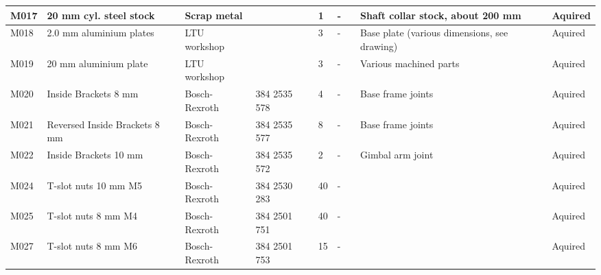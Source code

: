 \begin{longtable}{|m{}|m{}|m{}|m{}|m{}|m{}|m{}|m{}|m{}|}
M017        & 20 mm cyl. steel stock              & Scrap metal       &                         & 1            & -                            &                            & Shaft collar stock, about 200 mm                         & Aquired         \\ \hline
M018        & 2.0 mm aluminium plates             & LTU workshop      &                         & 3            & -                            &                            & Base plate (various dimensions, see drawing)             & Aquired         \\ \hline
M019        & 20 mm aluminium plate               & LTU workshop      &                         & 3            & -                            &                            & Various machined parts                                   & Aquired         \\ \hline
M020        & Inside Brackets 8 mm                & Bosch-Rexroth     & 384 2535 578              & 4            & -                            &                            & Base frame joints                                        & Aquired         \\ \hline
M021        & Reversed Inside Brackets 8 mm       & Bosch-Rexroth     & 384 2535 577              & 8            & -                            &                            & Base frame joints                                        & Aquired         \\ \hline
M022        & Inside Brackets 10 mm               & Bosch-Rexroth     & 384 2535 572              & 2            & -                            &                            & Gimbal arm joint                                         & Aquired         \\ \hline
M024        & T-slot nuts 10 mm M5                & Bosch-Rexroth     & 384 2530 283              & 40           & -                            &                            &                                                          & Aquired         \\ \hline
M025        & T-slot nuts 8 mm M4                 & Bosch-Rexroth     & 384 2501 751              & 40           & -                            &                            &                                                          & Aquired         \\ \hline
M027        & T-slot nuts 8 mm M6                 & Bosch-Rexroth     & 384 2501 753              & 15           & -                            &                            &                                                          & Aquired         \\ \hline

\end{longtable}
